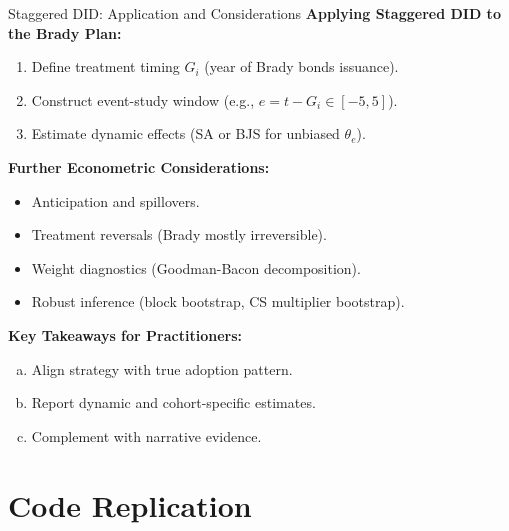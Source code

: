 \documentclass{beamer}
\begin{document}
\begin{frame}{Staggered DID: Application and Considerations}
  \textbf{Applying Staggered DID to the Brady Plan:}
  \begin{enumerate}
    \item Define treatment timing $G_i$ (year of Brady bonds issuance).
    \item Construct event-study window (e.g., $e=t-G_i \in [-5, 5]$).
    \item Estimate dynamic effects (SA or BJS for unbiased $\theta_e$).
  \end{enumerate}
  \textbf{Further Econometric Considerations:}
  \begin{itemize}
    \item Anticipation and spillovers.
    \item Treatment reversals (Brady mostly irreversible).
    \item Weight diagnostics (Goodman-Bacon decomposition).
    \item Robust inference (block bootstrap, CS multiplier bootstrap).
  \end{itemize}
  \textbf{Key Takeaways for Practitioners:}
  \begin{enumerate}[(a)]
    \item Align strategy with true adoption pattern.
    \item Report dynamic and cohort-specific estimates.
    \item Complement with narrative evidence.
  \end{enumerate}
\end{frame}


\section{Code Replication}
\end{document}
